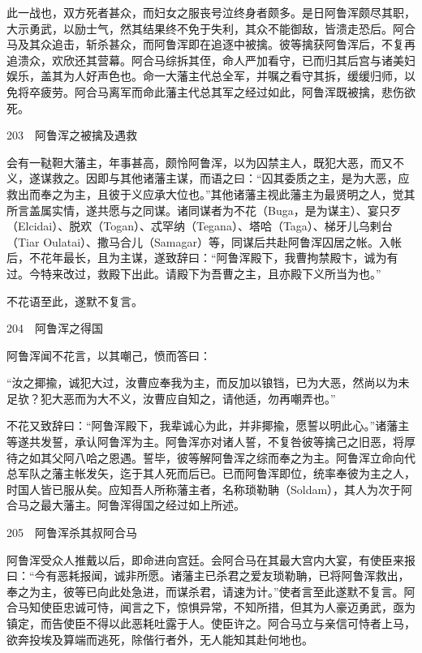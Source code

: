 \documentclass[12pt,UTF8]{ctexbook}
\begin{document}
此一战也，双方死者甚众，而妇女之服丧号泣终身者颇多。是日阿鲁浑颇尽其职，大示勇武，以励士气，然其结果终不免于失利，其众不能御敌，皆溃走恐后。阿合马及其众追击，斩杀甚众，而阿鲁浑即在追逐中被擒。彼等擒获阿鲁浑后，不复再追溃众，欢欣还其营幕。阿合马综拆其侄，命人严加看守，已而归其后宫与诸美妇娱乐，盖其为人好声色也。命一大藩主代总全军，并嘱之看守其拆，缓缓归师，以免将卒疲劳。阿合马离军而命此藩主代总其军之经过如此，阿鲁浑既被擒，悲伤欲死。





203　阿鲁浑之被擒及遇救

会有一鞑靼大藩主，年事甚高，颇怜阿鲁浑，以为囚禁主人，既犯大恶，而又不义，遂谋救之。因即与其他诸藩主谋，而语之曰：“囚其委质之主，是为大恶，应救出而奉之为主，且彼于义应承大位也。”其他诸藩主视此藩主为最贤明之人，觉其所言盖属实情，遂共愿与之同谋。诸同谋者为不花（Buga，是为谋主）、宴只歹（Elcidai）、脱欢（Togan）、忒罕纳（Tegana）、塔哈（Taga）、梯牙儿乌剌台（Tiar Oulatai）、撒马合儿（Samagar）等，同谋后共赴阿鲁浑囚居之帐。入帐后，不花年最长，且为主谋，遂致辞曰：“阿鲁浑殿下，我曹拘禁殿卞，诚为有过。今特来改过，救殿下出此。请殿下为吾曹之主，且亦殿下义所当为也。”

不花语至此，遂默不复言。





204　阿鲁浑之得国

阿鲁浑闻不花言，以其嘲己，愤而答曰：

“汝之揶揄，诚犯大过，汝曹应奉我为主，而反加以锒铛，已为大恶，然尚以为未足欤？犯大恶而为大不义，汝曹应自知之，请他适，勿再嘲弄也。”

不花又致辞曰：“阿鲁浑殿下，我辈诚心为此，并非揶揄，愿誓以明此心。”诸藩主等遂共发誓，承认阿鲁浑为主。阿鲁浑亦对诸人誓，不复咎彼等擒己之旧恶，将厚待之如其父阿八哈之恩遇。誓毕，彼等解阿鲁浑之综而奉之为主。阿鲁浑立命向代总军队之藩主帐发矢，迄于其人死而后已。已而阿鲁浑即位，统率奉彼为主之人，时国人皆已服从矣。应知吾人所称藩主者，名称琐勒聃（Soldam），其人为次于阿合马之最大藩主。阿鲁浑得国之经过如上所述。





205　阿鲁浑杀其叔阿合马

阿鲁浑受众人推戴以后，即命进向宫廷。会阿合马在其最大宫内大宴，有使臣来报曰：“今有恶耗报闻，诚非所愿。诸藩主已杀君之爱友琐勒聃，已将阿鲁浑救出，奉之为主，彼等已向此处急进，而谋杀君，请速为计。”使者言至此遂默不复言。阿合马知使臣忠诚可恃，闻言之下，惊惧异常，不知所措，但其为人豪迈勇武，亟为镇定，而告使臣不得以此恶耗吐露于人。使臣许之。阿合马立与亲信可恃者上马，欲奔投埃及算端而逃死，除偕行者外，无人能知其赴何地也。
\end{document}
